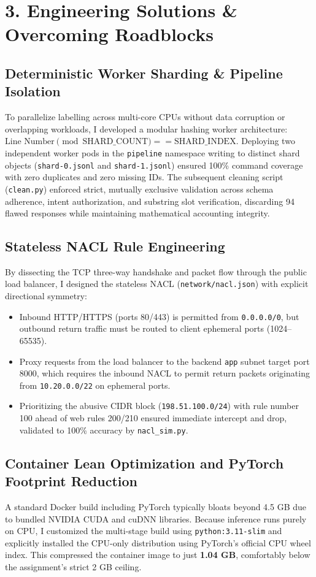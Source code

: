 \documentclass[10pt,a4paper]{article}
\begin{document}
\newpage

\section*{3. Engineering Solutions \& Overcoming Roadblocks}

\subsection*{Deterministic Worker Sharding \& Pipeline Isolation}
To parallelize labelling across multi-core CPUs without data corruption or overlapping workloads, I developed a modular hashing worker architecture: $\text{Line Number} \pmod{\text{SHARD\_COUNT}} == \text{SHARD\_INDEX}$. Deploying two independent worker pods in the \texttt{pipeline} namespace writing to distinct shard objects (\texttt{shard-0.jsonl} and \texttt{shard-1.jsonl}) ensured 100\% command coverage with zero duplicates and zero missing IDs. The subsequent cleaning script (\texttt{clean.py}) enforced strict, mutually exclusive validation across schema adherence, intent authorization, and substring slot verification, discarding 94 flawed responses while maintaining mathematical accounting integrity.

\subsection*{Stateless NACL Rule Engineering}
By dissecting the TCP three-way handshake and packet flow through the public load balancer, I designed the stateless NACL (\texttt{network/nacl.json}) with explicit directional symmetry:
\begin{itemize}[leftmargin=*,noitemsep]
    \item Inbound HTTP/HTTPS (ports 80/443) is permitted from \texttt{0.0.0.0/0}, but outbound return traffic must be routed to client ephemeral ports (1024--65535).
    \item Proxy requests from the load balancer to the backend \texttt{app} subnet target port 8000, which requires the inbound NACL to permit return packets originating from \texttt{10.20.0.0/22} on ephemeral ports.
    \item Prioritizing the abusive CIDR block (\texttt{198.51.100.0/24}) with rule number 100 ahead of web rules 200/210 ensured immediate intercept and drop, validated to 100\% accuracy by \texttt{nacl\_sim.py}.
\end{itemize}

\subsection*{Container Lean Optimization and PyTorch Footprint Reduction}
A standard Docker build including PyTorch typically bloats beyond 4.5 GB due to bundled NVIDIA CUDA and cuDNN libraries. Because inference runs purely on CPU, I customized the multi-stage build using \texttt{python:3.11-slim} and explicitly installed the CPU-only distribution using PyTorch's official CPU wheel index. This compressed the container image to just \textbf{1.04 GB}, comfortably below the assignment's strict 2 GB ceiling.
\end{document}
